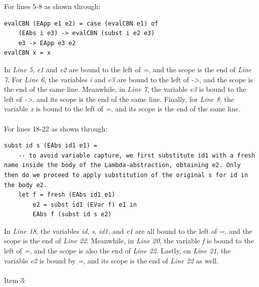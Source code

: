 \documentclass{article}
\theoremstyle{theorem}
\theoremstyle{definition}
\theoremstyle{remark}
\begin{document}
For lines 5-8 as shown through:
\begin{lstlisting}
evalCBN (EApp e1 e2) = case (evalCBN e1) of
    (EAbs i e3) -> evalCBN (subst i e2 e3)
    e3 -> EApp e3 e2
evalCBN x = x 
\end{lstlisting}
In \textit{Line 5}, \textit{e1} and \textit{e2} are bound to the left of \textit{=}, and the scope is the end of \textit{Line 7}. For \textit{Line 6}, the variables \textit{i} and \textit{e3} are bound to the left of \textit{->}, and the scope is the end of the same line. Meanwhile, in \textit{Line 7}, the variable \textit{e3} is bound to the left of \textit{->}, and its scope is the end of the same line. Finally, for \textit{Line 8}, the variable \textit{x} is bound to the left of \textit{=}, and its scope is the end of the same line.
\\
\\
For lines 18-22 as shown through:
\begin{lstlisting}
subst id s (EAbs id1 e1) = 
    -- to avoid variable capture, we first substitute id1 with a fresh name inside the body of the Lambda-abstraction, obtaining e2. Only then do we proceed to apply substitution of the original s for id in the body e2.
    let f = fresh (EAbs id1 e1)
        e2 = subst id1 (EVar f) e1 in 
        EAbs f (subst id s e2)
\end{lstlisting}
In \textit{Line 18}, the variables \textit{id}, \textit{s}, \textit{id1}, and \textit{e1} are all bound to the left of \textit{=}, and the scope is the end of \textit{Line 22}. Meanwhile, in \textit{Line 20}, the variable \textit{f} is bound to the left of \textit{=}, and the scope is also the end of \textit{Line 22}. Lastly, on \textit{Line 21}, the variable \textit{e2} is bound by \textit{=}, and its scope is the end of \textit{Line 22} as well.
\\
\\
Item 3:
\end{document}
